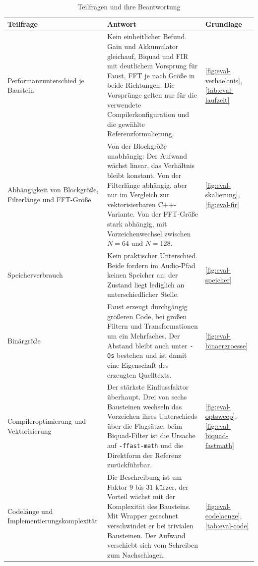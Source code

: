 \begin{table}[htb]
	\centering
	\small
	\caption{Teilfragen und ihre Beantwortung}
	\label{tab:disk-antworten}
	\renewcommand{\arraystretch}{1.25}
	\begin{tabularx}{\textwidth}{@{} L{34mm} X L{24mm} @{}}
		\toprule
		\textbf{Teilfrage} & \textbf{Antwort} & \textbf{Grundlage} \\
		\midrule
		Performanzunterschied je Baustein
		& Kein einheitlicher Befund. Gain und Akkumulator gleichauf, Biquad und
		FIR mit deutlichem Vorsprung für Faust, FFT je nach Größe in beide
		Richtungen. Die Vorsprünge gelten nur für die verwendete
		Compilerkonfiguration und die gewählte Referenzformulierung.
		& \ref{fig:eval-verhaeltnis}, \ref{tab:eval-laufzeit} \\
		Abhängigkeit von Blockgröße, Filterlänge und FFT-Größe
		& Von der Blockgröße unabhängig: Der Aufwand wächst linear, das
		Verhältnis bleibt konstant. Von der Filterlänge abhängig, aber nur im
		Vergleich zur vektorisierbaren C++-Variante. Von der FFT-Größe stark
		abhängig, mit Vorzeichenwechsel zwischen $N=64$ und $N=128$.
		& \ref{fig:eval-skalierung}, \ref{fig:eval-fir} \\
		Speicherverbrauch
		& Kein praktischer Unterschied. Beide fordern im Audio-Pfad keinen
		Speicher an; der Zustand liegt lediglich an unterschiedlicher Stelle.
		& \ref{fig:eval-speicher} \\
		Binärgröße
		& Faust erzeugt durchgängig größeren Code, bei großen Filtern und
		Transformationen um ein Mehrfaches. Der Abstand bleibt auch unter
		\texttt{-Os} bestehen und ist damit eine Eigenschaft des erzeugten
		Quelltexts.
		& \ref{fig:eval-binaergroesse} \\
		Compileroptimierung und Vektorisierung
		& Der stärkste Einflussfaktor überhaupt. Drei von sechs Bausteinen
		wechseln das Vorzeichen ihres Unterschieds über die Flagsätze; beim
		Biquad-Filter ist die Ursache auf \texttt{-ffast-math} und die
		Direktform der Referenz zurückführbar.
		& \ref{fig:eval-optsweep}, \ref{fig:eval-biquad-fastmath} \\
		Codelänge und Implementierungskomplexität
		& Die Beschreibung ist um Faktor $9$ bis $31$ kürzer, der Vorteil
		wächst mit der Komplexität des Bausteins. Mit Wrapper gerechnet
		verschwindet er bei trivialen Bausteinen. Der Aufwand verschiebt sich
		vom Schreiben zum Nachschlagen.
		& \ref{fig:eval-codelaenge}, \ref{tab:eval-code} \\
		\bottomrule
	\end{tabularx}
\end{table}

